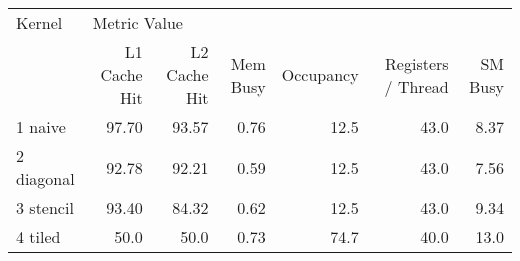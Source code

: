 \begin{tabular}{lrrrrrr}
\toprule
    Kernel & \multicolumn{6}{l}{Metric Value} \\
           & L1 Cache Hit & L2 Cache Hit & Mem Busy & Occupancy & Registers / Thread & SM Busy \\
\midrule
   1 naive &        97.70 &        93.57 &     0.76 &      12.5 &               43.0 &    8.37 \\
2 diagonal &        92.78 &        92.21 &     0.59 &      12.5 &               43.0 &    7.56 \\
 3 stencil &        93.40 &        84.32 &     0.62 &      12.5 &               43.0 &    9.34 \\
 4 tiled   &        50.0  &        50.0 &      0.73 &      74.7 &               40.0 &    13.0 \\
\bottomrule
\end{tabular}
